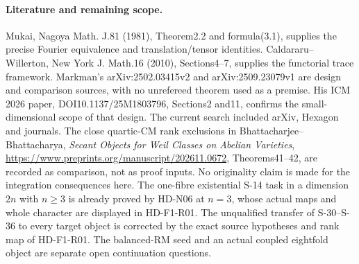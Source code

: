 \paragraph{Literature and remaining scope.}
Mukai, Nagoya Math. J.81 (1981), Theorem2.2 and formula(3.1),
supplies the precise Fourier equivalence and translation/tensor
identities. Caldararu--Willerton, New York J. Math.16 (2010),
Sections4--7, supplies the functorial trace framework.
Markman's arXiv:2502.03415v2 and arXiv:2509.23079v1 are design
and comparison sources, with no unrefereed theorem used as a
premise. His ICM 2026 paper, DOI10.1137/25M1803796,
Sections2 and11, confirms the small-dimensional scope of that
design. The current search included arXiv, Hexagon and journals.
The close quartic-CM rank exclusions in Bhattacharjee--Bhattacharya,
\emph{Secant Objects for Weil Classes on Abelian Varieties},
\url{https://www.preprints.org/manuscript/202611.0672},
Theorems41--42, are recorded as comparison, not as proof inputs.
No originality claim is made for the integration consequences here.
The one-fibre existential S-14 task in a dimension $2n$ with
$n\ge3$ is already proved by HD-N06 at $n=3$, whose actual
maps and whole character are displayed in HD-F1-R01. The
unqualified transfer of S-30--S-36 to every target object is
corrected by the exact source hypotheses and rank map of
HD-F1-R01. The balanced-RM seed and an actual coupled
eightfold object are separate open continuation questions.
